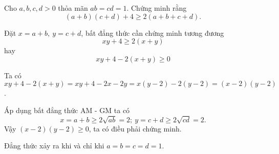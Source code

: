 \begin{problem}
	Cho $a, b, c, d > 0$ thỏa mãn $ab = cd = 1$. Chứng minh rằng
	\[
		(a + b)(c + d) + 4 \ge 2(a + b + c + d).
	\]

	\solution

	Đặt $x = a + b,\ y = c + d$, bất đẳng thức cần chứng minh tương đương
	\[
		xy + 4 \ge 2(x + y)
	\]
	hay 
	\[
		xy + 4 - 2(x + y) \ge 0
	\]

	Ta có $xy + 4 - 2(x + y) = xy + 4 - 2x - 2y = x(y - 2) - 2(y - 2) = (x - 2)(y - 2)$.

	Áp dụng bất đẳng thức AM - GM ta có
	\[
		x = a + b \ge 2\sqrt{ab} = 2;\ y = c + d \ge 2\sqrt{cd} = 2.
	\]
	Vậy $(x - 2)(y - 2) \ge 0$, ta có điều phải chứng minh.

	Đẳng thức xảy ra khi và chỉ khi $a = b = c = d = 1$.
\end{problem}